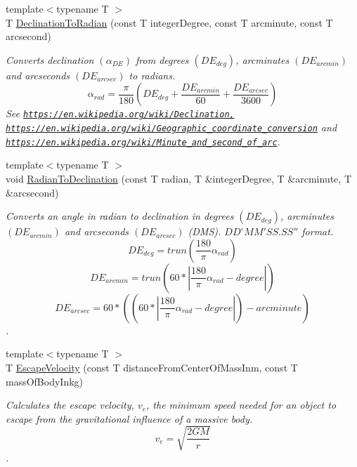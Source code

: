 \begin{DoxyCompactItemize}
{\footnotesize template$<$typename T $>$ }\\T \mbox{\hyperlink{group___e_g_x_phys-_astrophysics-_declination_ga384229c66d2ea6249c9609caa1ec9354}{Declination\+To\+Radian}} (const T integer\+Degree, const T arcminute, const T arcsecond)
\begin{DoxyCompactList}\small\item\em Converts declination $(\alpha_{DE})$ from degrees $(DE_{deg})$, arcminutes $(DE_{arcmin})$ and arcseconds $(DE_{arcsec})$ to radians. \[\alpha_{rad}=\frac{\pi}{180}(DE_{deg} + \frac{DE_{arcmin}}{60} + \frac{DE_{arcsec}}{3600})\] See \href{https://en.wikipedia.org/wiki/Declination,}{\tt https\+://en.\+wikipedia.\+org/wiki/\+Declination,} \href{https://en.wikipedia.org/wiki/Geographic_coordinate_conversion}{\tt https\+://en.\+wikipedia.\+org/wiki/\+Geographic\+\_\+coordinate\+\_\+conversion} and \href{https://en.wikipedia.org/wiki/Minute_and_second_of_arc}{\tt https\+://en.\+wikipedia.\+org/wiki/\+Minute\+\_\+and\+\_\+second\+\_\+of\+\_\+arc}. \end{DoxyCompactList}\item 
{\footnotesize template$<$typename T $>$ }\\void \mbox{\hyperlink{group___e_g_x_phys-_astrophysics-_declination_gad12d59741171420fc420f3c469df4a82}{Radian\+To\+Declination}} (const T radian, T \&integer\+Degree, T \&arcminute, T \&arcsecond)
\begin{DoxyCompactList}\small\item\em Converts an angle in radian to declination in degrees $(DE_{deg})$, arcminutes $(DE_{arcmin})$ and arcseconds $(DE_{arcsec})$ (D\+MS). ${DD}^{\circ}{MM}'{SS.SS}''$ format. \[DE_{deg}=trun(\frac{180}{\pi}\alpha_{rad})\] \[DE_{arcmin}=trun(60 * |\frac{180}{\pi}\alpha_{rad} - degree|)\] \[DE_{arcsec}=60 * ((60 * |\frac{180}{\pi}\alpha_{rad} - degree|)-arcminute)\]. \end{DoxyCompactList}\item 
{\footnotesize template$<$typename T $>$ }\\T \mbox{\hyperlink{group___e_g_x_phys-_astrophysics-_escape_velocity_gaeb8c0c9e780f883ea33498f076b08cb9}{Escape\+Velocity}} (const T distance\+From\+Center\+Of\+Mass\+Inm, const T mass\+Of\+Body\+Inkg)
\begin{DoxyCompactList}\small\item\em Calculates the escape velocity, $v_{e}$, the minimum speed needed for an object to escape from the gravitational influence of a massive body. \[v_{e}=\sqrt{\frac{2 G M}{r}}\]. \end{DoxyCompactList}\item 

\end{DoxyCompactItemize}
